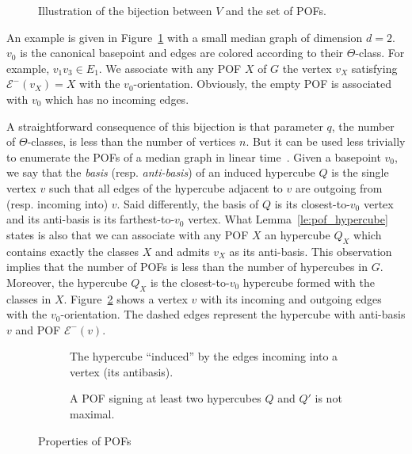 \documentclass[a4paper,UKenglish,numberwithinsect,cleveref, autoref]{lipics-v2021}
\begin{document}
\begin{figure}[h]
\centering
\scalebox{0.95}{}
\caption{Illustration of the bijection between $V$ and the set of POFs.}
\label{fig:vertices_pof}
\end{figure}

An example is given in Figure~\ref{fig:vertices_pof} with a small median graph of dimension $d=2$. $v_0$ is the canonical basepoint  and edges are colored according to  their $\Theta$-class. For example, $v_1v_3 \in E_1$. We associate with any POF $X$ of $G$ the vertex $v_X$ satisfying $\mathcal{E}^-(v_X) = X$ with the $v_0$-orientation. Obviously, the empty POF is associated with $v_0$ which has no incoming edges.

A straightforward consequence of this bijection is that parameter $q$, the number of $\Theta$-classes, is less than the number of vertices $n$. But it can be used less trivially to enumerate the POFs of a median graph in linear time~\cite{BaQuSaMa02,Ko09}. Given a basepoint $v_0$, we say that the \textit{basis} (resp. \textit{anti-basis}) of an induced hypercube $Q$ is the single vertex $v$ such that all edges of the hypercube adjacent to $v$ are outgoing from (resp. incoming into) $v$. Said differently, the basis of $Q$ is its closest-to-$v_0$ vertex and its anti-basis is its farthest-to-$v_0$ vertex. What Lemma~\ref{le:pof_hypercube} states is also that we can associate with any POF $X$ an hypercube $Q_X$ which contains exactly the classes $X$ and admits $v_X$ as its anti-basis. This observation implies that the number of POFs is less than the number of hypercubes in $G$. Moreover, the hypercube $Q_X$ is the closest-to-$v_0$ hypercube formed with the classes in $X$. Figure~\ref{subfig:ingoing_edges} shows a vertex $v$ with its incoming and outgoing edges with the $v_0$-orientation. The dashed edges represent the hypercube with anti-basis $v$ and POF $\mathcal{E}^-(v)$.

\begin{figure}[h]
\begin{subfigure}[b]{0.49\columnwidth}
\centering
\scalebox{0.8}{}
\caption{The hypercube ``induced'' by the edges incoming into a vertex (its antibasis).}
\label{subfig:ingoing_edges}
\end{subfigure}
\begin{subfigure}[b]{0.49\columnwidth}
\centering
\scalebox{0.8}{}
\caption{A POF signing at least two hypercubes $Q$ and $Q'$ is not maximal.}
\label{subfig:maximal_pof}
\end{subfigure}
\caption{Properties of POFs}
\label{fig:properties_pofs}
\end{figure} 
\end{document}
